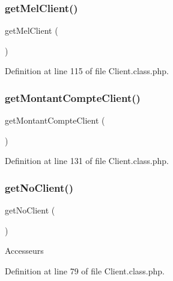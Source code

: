 \mbox{\label{class_client_afd1fd9d824c0076519669b6fb6501413}} 
\subsubsection{\texorpdfstring{get\+Mel\+Client()}{getMelClient()}}
{\footnotesize\ttfamily get\+Mel\+Client (\begin{DoxyParamCaption}{ }\end{DoxyParamCaption})}



Definition at line 115 of file Client.\+class.\+php.

\mbox{\label{class_client_a1b9e3a8fd70187ddf7f8fabd58bb81f1}} 
\subsubsection{\texorpdfstring{get\+Montant\+Compte\+Client()}{getMontantCompteClient()}}
{\footnotesize\ttfamily get\+Montant\+Compte\+Client (\begin{DoxyParamCaption}{ }\end{DoxyParamCaption})}



Definition at line 131 of file Client.\+class.\+php.

\mbox{\label{class_client_aa1421f4c633c8b54d15564a0e1639910}} 
\subsubsection{\texorpdfstring{get\+No\+Client()}{getNoClient()}}
{\footnotesize\ttfamily get\+No\+Client (\begin{DoxyParamCaption}{ }\end{DoxyParamCaption})}

Accesseurs 

Definition at line 79 of file Client.\+class.\+php.

\mbox{\label{class_client_aedb289529f155ec710a5ba56ca9b4aac}} 
